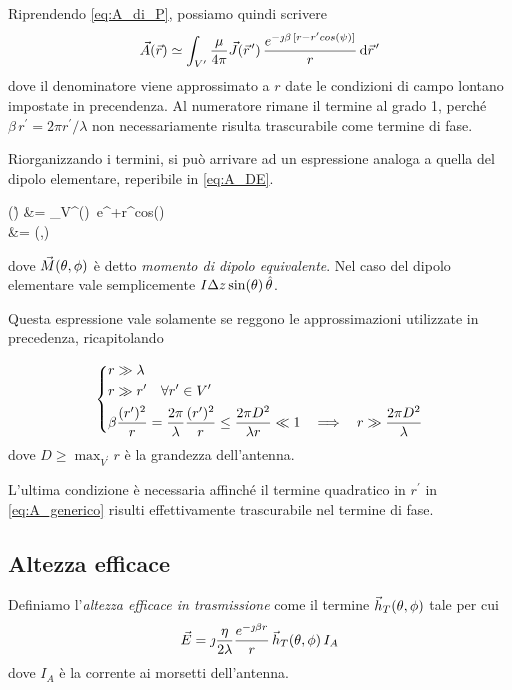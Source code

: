 Riprendendo \autoref{eq:A_di_P}, possiamo quindi scrivere
\begin{equation} \label{eq:A_generico}
	\A(\r)
	\simeq \int_{V^\prime} \frac{\mu}{4\pi} \J(\rp) \, \frac{e^{-\jmath\beta \, [r-r^\prime cos(\psi)]}}{r} \de \rp
\end{equation}
dove il denominatore viene approssimato a $r$ date le condizioni di campo lontano impostate in precendenza.
Al numeratore rimane il termine al grado 1, perché $\beta \, r^\prime = 2\pi r^\prime / \lambda$ non necessariamente risulta trascurabile come termine di fase.

Riorganizzando i termini, si può arrivare ad un espressione analoga a quella del dipolo elementare, reperibile in \autoref{eq:A_DE}.

\begin{esp*}
	\A(\r)
	&=
	\int_{V^\prime}\J(\rp)\, e^{+\jmath\beta r^\prime cos(\psi)} \de \rp \\
	&= \M(\theta,\phi)\\
\end{esp*}
dove $\vec{M}(\theta,\phi)$ è detto \emph{momento di dipolo equivalente}.
Nel caso del dipolo elementare vale semplicemente $I \Delta z \sin(\theta) \,\hat{\theta}$.

Questa espressione vale solamente se reggono le approssimazioni utilizzate in precedenza, ricapitolando

\begin{equation} \label{eq:campo_lontano_generico}
	\begin{dcases}
		r \gg \lambda \\
		r \gg r^\prime \quad \forall r^\prime \in V^\prime \\
		\beta \frac{(r^\prime)^2}{r}
		= \frac{2\pi}{\lambda} \frac{(r^\prime)^2}{r}
		\le \frac{2\pi D^2}{\lambda r}
		\ll 1
		~~ \implies ~~
		r \gg \frac{2\pi D^2}{\lambda}
	\end{dcases}
\end{equation}
dove $D \ge \max_{V^\prime} r$ è la grandezza dell'antenna.

L'ultima condizione è necessaria affinché il termine quadratico in $r^\prime$ in \autoref{eq:A_generico} risulti effettivamente trascurabile nel termine di fase.

\subsection{Altezza efficace}
Definiamo l'\emph{altezza efficace in trasmissione} come il termine $\vec{h}_T(\theta,\phi)$ tale per cui
\begin{equation}
	\vec{E}
	= \jmath \frac{\eta}{2\lambda} \frac{e^{-\jmath \beta r}}{r} \, \vec{h}_T(\theta,\phi) \, I_A
\end{equation}
dove $I_A$ è la corrente ai morsetti dell'antenna.

